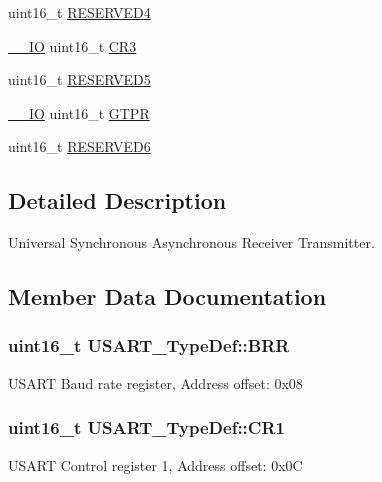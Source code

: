 \begin{DoxyCompactItemize}
\item 
uint16\+\_\+t \hyperlink{struct_u_s_a_r_t___type_def_a6ac527c7428ad8807a7740c1f33f0351}{R\+E\+S\+E\+R\+V\+E\+D4}
\item 
\hyperlink{core__cm4_8h_aec43007d9998a0a0e01faede4133d6be}{\+\_\+\+\_\+\+IO} uint16\+\_\+t \hyperlink{struct_u_s_a_r_t___type_def_a2b9d1df38cb1d745305c8190a8707a0f}{C\+R3}
\item 
uint16\+\_\+t \hyperlink{struct_u_s_a_r_t___type_def_aa893512291681dfbecc5baa899cfafbf}{R\+E\+S\+E\+R\+V\+E\+D5}
\item 
\hyperlink{core__cm4_8h_aec43007d9998a0a0e01faede4133d6be}{\+\_\+\+\_\+\+IO} uint16\+\_\+t \hyperlink{struct_u_s_a_r_t___type_def_abe51502097b1fd281d0a2a1b157d769e}{G\+T\+PR}
\item 
uint16\+\_\+t \hyperlink{struct_u_s_a_r_t___type_def_acd89bb1cba0381c2be8a551e6d14e9f7}{R\+E\+S\+E\+R\+V\+E\+D6}
\end{DoxyCompactItemize}


\subsection{Detailed Description}
Universal Synchronous Asynchronous Receiver Transmitter. 

\subsection{Member Data Documentation}
\subsubsection[{\texorpdfstring{B\+RR}{BRR}}]{ uint16\+\_\+t U\+S\+A\+R\+T\+\_\+\+Type\+Def\+::\+B\+RR}\hypertarget{struct_u_s_a_r_t___type_def_a2044eb2a0a8a731400d309741bceb2f7}{}\label{struct_u_s_a_r_t___type_def_a2044eb2a0a8a731400d309741bceb2f7}
U\+S\+A\+RT Baud rate register, Address offset\+: 0x08 
\subsubsection[{\texorpdfstring{C\+R1}{CR1}}]{ uint16\+\_\+t U\+S\+A\+R\+T\+\_\+\+Type\+Def\+::\+C\+R1}\hypertarget{struct_u_s_a_r_t___type_def_a5de50313b1437f7f926093f00902d37a}{}\label{struct_u_s_a_r_t___type_def_a5de50313b1437f7f926093f00902d37a}
U\+S\+A\+RT Control register 1, Address offset\+: 0x0C 
